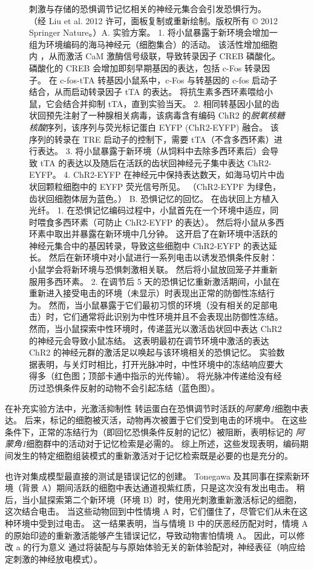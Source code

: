 \begin{figure}[htbp]
	\caption{刺激与存储的恐惧调节记忆相关的神经元集合会引发恐惧行为。 （经 Liu et al. 2012 许可，面板复制或重新绘制。版权所有 © 2012 Springer Nature。）A. 实验方案。 1. 将小鼠暴露于新环境会增加一组为环境编码的海马神经元（细胞集合）的活动。 该活性增加细胞内 ，从而激活 CaM 激酶信号级联，导致转录因子 CREB 磷酸化。 磷酸化的 CREB 会增加即刻早期基因的表达，包括 c-Fos 转录因子。 在 c-fos-tTA 转基因小鼠系中，c-Fos 与转基因的 c-fos 启动子结合，从而启动转录因子 tTA 的表达。 将抗生素多西环素喂给小鼠，它会结合并抑制 tTA，直到实验当天。 2. 相同转基因小鼠的齿状回预先注射了一种腺相关病毒，该病毒含有编码 ChR2 的\textit{脱氧核糖核酸}序列，该序列与荧光标记蛋白 EYFP (ChR2-EYFP) 融合。 该序列的转录在 TRE 启动子的控制下，需要 tTA（不含多西环素）进行表达。 3. 将小鼠暴露于新环境（从饲料中去除多西环素后）会导致 tTA 的表达以及随后在活跃的齿状回神经元子集中表达 ChR2-EYFP。 4. ChR2-EYFP 在神经元中保持表达数天，如海马切片中齿状回颗粒细胞中的 EYFP 荧光信号所见。 （ChR2-EYPF 为绿色，齿状回细胞体层为蓝色。） B. 恐惧记忆的回忆。 在齿状回上方植入光纤。 1. 在恐惧记忆编码过程中，小鼠首先在一个环境中适应，同时喂食多西环素（可防止 ChR2-EYFP 的表达）。 然后将小鼠从多西环素中取出并暴露在新环境中几分钟。 这开启了在新环境中活跃的神经元集合中的基因转录，导致这些细胞中 ChR2-EYFP 的表达延长。 然后在新环境中对小鼠进行一系列电击以诱发恐惧条件反射：小鼠学会将新环境与恐惧刺激相关联。 然后将小鼠放回笼子并重新服用多西环素。 2. 在调节后 5 天的恐惧记忆重新激活期间，小鼠在重新进入接受电击的环境（未显示）时表现出正常的防御性冻结行为。 然而，当小鼠暴露于它们最初习惯的环境（没有相关的足部电击）时，它们通常将此识别为中性环境并且不会表现出防御性冻结。 然而，当小鼠探索中性环境时，传递蓝光以激活齿状回中表达 ChR2 的神经元会导致小鼠冻结。 这表明最初在调节环境中激活的表达 ChR2 的神经元群的激活足以唤起与该环境相关的恐惧记忆。 实验数据表明，与关灯时相比，打开光脉冲时，中性环境中的冻结响应要大得多（红色图；顶部卡通中指示的光传输）。 将光脉冲传递给没有经历过恐惧条件反射的动物不会引起冻结（蓝色图）。}
	\label{fig:54_11}
\end{figure}


在补充实验方法中，光激活抑制性  转运蛋白在恐惧调节时活跃的\textit{阿蒙角1}细胞中表达。
后来，标记的细胞被灭活，动物再次被置于它们受到电击的环境中。
在这些条件下，正常的冻结行为（即回忆恐惧条件反射的记忆）被阻断，表明标记的 \textit{阿蒙角1}细胞群中的活动对于记忆检索是必需的。
综上所述，这些发现表明，编码期间发生的特定细胞组装模式的重新激活对于记忆检索既是必要的也是充分的。


也许对集成模型最直接的测试是错误记忆的创建。 Tonegawa 及其同事在探索新环境（背景 A）期间活跃的细胞中表达通道视紫红质，只是这次没有发出电击。
稍后，当小鼠探索第二个新环境（环境 B）时，使用光刺激重新激活标记的细胞，这次结合电击。
当这些动物回到中性情境 A 时，它们僵住了，尽管它们从未在这种环境中受到过电击。
这一结果表明，当与情境 B 中的厌恶经历配对时，情境 A 的原始印迹的重新激活能够产生错误记忆，导致动物害怕情境 A。
因此，可以修改 a 的行为意义 通过将装配与与原始体验无关的新体验配对，神经表征（响应给定刺激的神经放电模式）。



